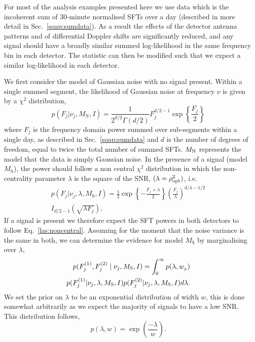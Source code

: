 %
%
For most of the analysis examples presented here we use data which is the incoherent sum of 30-minute normalised \glspl{SFT} over a day (described in more detail in Sec.~\ref{soap:sumdata}). As a result the effects of the detector antenna patterns and of differential Doppler shifts are significantly reduced, and any signal should have a broadly similar summed log-likelihood in the same frequency bin in each detector. The statistic can then be modified such that we expect a similar log-likelihood in each detector.

We first consider the model of Gaussian noise with no signal present. Within
a single summed segment, the likelihood of Gaussian noise at
frequency $\nu$ is given by a $\chi^2$ distribution,
%
\begin{equation}
\label{las:central}
p(F_j|\nu_j,M_{\text{N}},I) = \frac{1}{2^{d/2}\Gamma(d/2)}F_j^{d/2 - 1}\exp{\left\{
\frac{F_j}{2}\right\}}
\end{equation}
%
where $F_j$ is the frequency domain power summed over sub-segments within a single day, as described in Sec.~\ref{soap:sumdata} and  $d$ is the number of degrees of freedom,  equal to twice the total number of summed SFTs.  $M_{\rm{N}}$ represents the model that the data is simply Gaussian noise. In the presence of a signal (model $M_{\text{S}}$), the power should follow a non central $ \chi^2 $ distribution in which the non-centrality parameter $\lambda$ is the square of the \gls{SNR}, $(\lambda = \rho_{\rm{opt}}^2 )$, i.e.
%
\begin{equation}
\label{las:noncentral}
\begin{split}
p(F_j|\nu_j,\lambda,M_{\text{S}},I) = \frac{1}{2} \exp{\left\{ -\frac{F_j+\lambda}{2}\right\}} \left( \frac{F_j}{\lambda} \right)^{d/4 - 1/2} \\
I_{d/2 -1}\left( \sqrt{\lambda F_j}\right).
\end{split}
\end{equation}
%
If a signal is present we therefore expect the \gls{SFT} powers in both detectors to follow Eq.~\ref{las:noncentral}.  Assuming for the moment that the noise variance is the same in both, we can determine the evidence for model $M_{\text{S}}$ by marginalising over $\lambda$,
%
\begin{equation}
\label{las:signal}
\begin{split}
p(F^{(1)}_{j},F^{(2)}_{j} \mid \nu_j,M_{\rm{S}},I) = \int_0^{\infty}  p(\lambda,w_{\rm_S}) \\
p(F^{(1)}_{j}|\nu_j,\lambda,M_{\text{S}},I)p(F^{(2)}_{j}|\nu_j,\lambda,M_{\text{S}},I) d\lambda.
\end{split}
\end{equation}
%
We set the prior on $\lambda$ to be an exponential distribution of width $w$, this is done somewhat arbitrarily as we expect the majority of signals to have a low \gls{SNR}. This distribution follows,
\begin{equation}
\label{las:prior}
p(\lambda,w) = \exp\left( \frac{-\lambda}{w}\right).
\end{equation}

